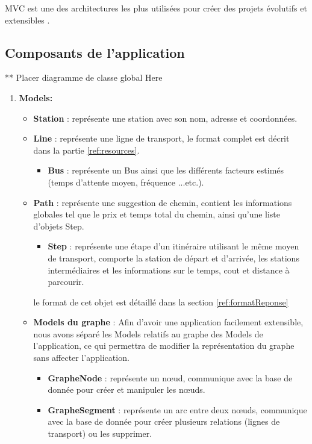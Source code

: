 MVC est une des architectures les plus utilisées pour créer des projets évolutifs et extensibles \cite{refMVC}.

\subsection{Composants de l'application}
** Placer diagramme de classe global Here
	
\begin{enumerate}
	\item \textbf{Models:}
	      \begin{itemize}
	      	\item \textbf{Station} : représente une station avec son nom, adresse et coordonnées.
	      	\item \textbf{Line} : représente une ligne de transport, le format complet est décrit dans la partie \ref{ref:resources}.
	      	      \begin{itemize}
	      	      	\item \textbf{Bus} : représente un Bus ainsi que les différents facteurs estimés (temps d'attente moyen, fréquence ...etc.).
	      	      \end{itemize}
	      	\item \textbf{Path} : représente une suggestion de chemin, contient les informations globales tel que le prix et temps total du chemin, ainsi qu'une liste d'objets Step.
	      	      \begin{itemize}
	      	      	\item \textbf{Step} : représente une étape d'un itinéraire utilisant le même moyen de transport, comporte la station de départ et d'arrivée, les stations intermédiaires et les informations sur le temps, cout et distance à parcourir.
	      	      \end{itemize}
	      	      le format de cet objet est détaillé dans la section \ref{ref:formatReponse}
	      	\item \textbf{Models du graphe} : 
	      	      Afin d'avoir une application facilement extensible, nous avons séparé les Models relatifs au graphe des Models de l'application, ce qui permettra de modifier la représentation du graphe sans affecter l'application.
	      	      \begin{itemize}
	      	      	\item \textbf{GrapheNode} : représente un nœud, communique avec la base de donnée pour créer et manipuler les nœuds.
	      	      	\item \textbf{GrapheSegment} : représente un arc entre deux nœuds, communique avec la base de donnée pour créer plusieurs relations (lignes de transport) ou les supprimer.
	      	      \end{itemize}
	      \end{itemize}
	      	

\end{enumerate}
